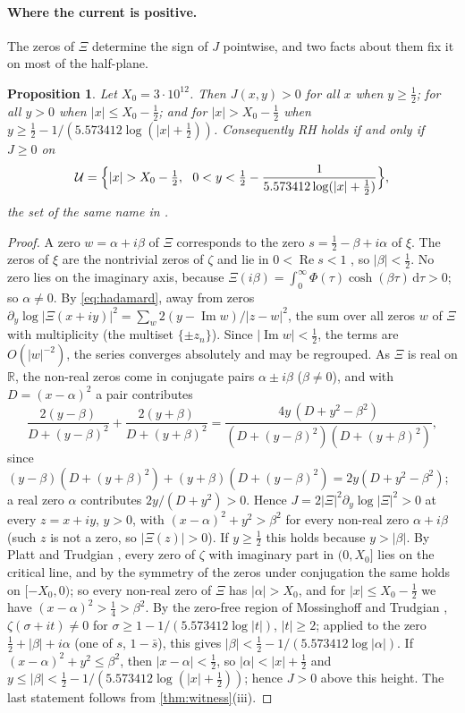 \documentclass[11pt]{article}
\newtheorem{proposition}[theorem]{Proposition}
\theoremstyle{definition}\newtheorem{definition}[theorem]{Definition}
\theoremstyle{remark}\newtheorem{remark}[theorem]{Remark}
\newcommand{\R}{\mathbb R}\newcommand{\C}{\mathbb C}\newcommand{\N}{\mathbb N}
\newcommand{\dd}{\,\mathrm d}\newcommand{\e}{\mathrm e}
\renewcommand{\Re}{\operatorname{Re}}\renewcommand{\Im}{\operatorname{Im}}
\begin{document}
\paragraph{Where the current is positive.} The zeros of $\Xi$ determine the sign of $J$ pointwise, and two facts about them fix it on most of the half-plane.

\begin{proposition}\label{prop:pos}
Let $X_0=3\cdot10^{12}$. Then $J(x,y)>0$ for all $x$ when $y\ge\frac12$; for all $y>0$ when $|x|\le X_0-\frac12$; and for $|x|>X_0-\frac12$ when $y\ge\frac12-1/(5.573412\log(|x|+\frac12))$. Consequently RH holds if and only if $J\ge0$ on
\[
\mathcal U=\Bigl\{|x|>X_0-\tfrac12,\ \ 0<y<\tfrac12-\frac1{5.573412\log(|x|+\frac12)}\Bigr\},
\]
the set of the same name in \cite{SMath}.
\end{proposition}
\begin{proof}
A zero $w=\alpha+i\beta$ of $\Xi$ corresponds to the zero $s=\frac12-\beta+i\alpha$ of $\xi$. The zeros of $\xi$ are the nontrivial zeros of $\zeta$ and lie in $0<\Re s<1$ \cite[\S2.12 and Ch.~3]{Titchmarsh}, so $|\beta|<\frac12$. No zero lies on the imaginary axis, because $\Xi(i\beta)=\int_0^\infty\Phi(\tau)\cosh(\beta\tau)\dd\tau>0$; so $\alpha\ne0$. By \cref{eq:hadamard}, away from zeros $\partial_y\log|\Xi(x+iy)|^2=\sum_w2(y-\Im w)/|z-w|^2$, the sum over all zeros $w$ of $\Xi$ with multiplicity (the multiset $\{\pm z_n\}$). Since $|\Im w|<\frac12$, the terms are $O(|w|^{-2})$, the series converges absolutely and may be regrouped. As $\Xi$ is real on $\R$, the non-real zeros come in conjugate pairs $\alpha\pm i\beta$ ($\beta\ne0$), and with $D=(x-\alpha)^2$ a pair contributes
\[
\frac{2(y-\beta)}{D+(y-\beta)^2}+\frac{2(y+\beta)}{D+(y+\beta)^2}=\frac{4y\,(D+y^2-\beta^2)}{(D+(y-\beta)^2)(D+(y+\beta)^2)},
\]
since $(y-\beta)(D+(y+\beta)^2)+(y+\beta)(D+(y-\beta)^2)=2y(D+y^2-\beta^2)$; a real zero $\alpha$ contributes $2y/(D+y^2)>0$. Hence $J=2|\Xi|^2\partial_y\log|\Xi|^2>0$ at every $z=x+iy$, $y>0$, with $(x-\alpha)^2+y^2>\beta^2$ for every non-real zero $\alpha+i\beta$ (such $z$ is not a zero, so $|\Xi(z)|>0$). If $y\ge\frac12$ this holds because $y>|\beta|$. By Platt and Trudgian \cite{PT}, every zero of $\zeta$ with imaginary part in $(0,X_0]$ lies on the critical line, and by the symmetry of the zeros under conjugation the same holds on $[-X_0,0)$; so every non-real zero of $\Xi$ has $|\alpha|>X_0$, and for $|x|\le X_0-\frac12$ we have $(x-\alpha)^2>\frac14>\beta^2$. By the zero-free region of Mossinghoff and Trudgian \cite{MT}, $\zeta(\sigma+it)\ne0$ for $\sigma\ge1-1/(5.573412\log|t|)$, $|t|\ge2$; applied to the zero $\frac12+|\beta|+i\alpha$ (one of $s$, $1-\bar s$), this gives $|\beta|<\frac12-1/(5.573412\log|\alpha|)$. If $(x-\alpha)^2+y^2\le\beta^2$, then $|x-\alpha|<\frac12$, so $|\alpha|<|x|+\frac12$ and $y\le|\beta|<\frac12-1/(5.573412\log(|x|+\frac12))$; hence $J>0$ above this height. The last statement follows from \cref{thm:witness}(iii).
\end{proof}
\end{document}
